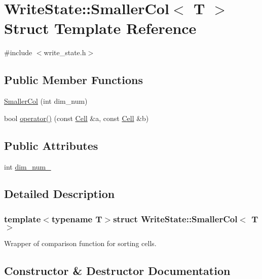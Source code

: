\hypertarget{structWriteState_1_1SmallerCol}{}\section{Write\+State\+:\+:Smaller\+Col$<$ T $>$ Struct Template Reference}
\label{structWriteState_1_1SmallerCol}


{\ttfamily \#include $<$write\+\_\+state.\+h$>$}

\subsection*{Public Member Functions}
\begin{DoxyCompactItemize}
\item 
\hyperlink{structWriteState_1_1SmallerCol_a808e5fc001a2792e8719063413de8cfd}{Smaller\+Col} (int dim\+\_\+num)
\item 
bool \hyperlink{structWriteState_1_1SmallerCol_afa9616b1b336380e44c27df71d299cf4}{operator()} (const \hyperlink{structWriteState_1_1Cell}{Cell} \&a, const \hyperlink{structWriteState_1_1Cell}{Cell} \&b)
\end{DoxyCompactItemize}
\subsection*{Public Attributes}
\begin{DoxyCompactItemize}
\item 
int \hyperlink{structWriteState_1_1SmallerCol_a9547a136dffb88ec403bd9467065d13e}{dim\+\_\+num\+\_\+}
\end{DoxyCompactItemize}


\subsection{Detailed Description}
\subsubsection*{template$<$typename T$>$struct Write\+State\+::\+Smaller\+Col$<$ T $>$}

Wrapper of comparison function for sorting cells. 

\subsection{Constructor \& Destructor Documentation}
\hypertarget{structWriteState_1_1SmallerCol_a808e5fc001a2792e8719063413de8cfd}{}

